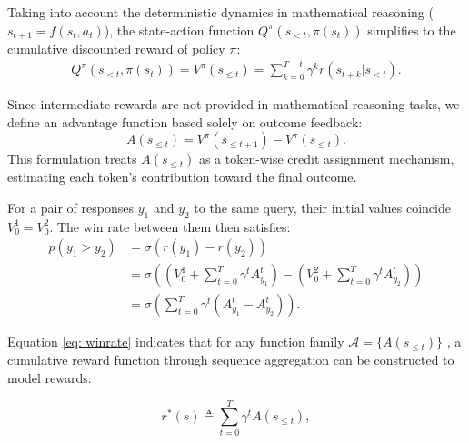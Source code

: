 Taking into account the deterministic dynamics in mathematical reasoning (\(s_{t+1} = f(s_t, a_t)\)), the state-action function $Q^\pi(s_{<t}, \pi(s_t))$ simplifies to the cumulative discounted reward of policy \(\pi\):  
\begin{align}\label{eq: vandq}
    Q^\pi(s_{<t}, \pi(s_t)) = V^\pi(s_{\leq t}) =  \sum_{k=0}^{T-t} \gamma^k r(s_{t+k} | s_{<t}).
\end{align}

Since intermediate rewards are not provided in mathematical reasoning tasks, we define an advantage function based solely on outcome feedback:
\begin{equation}
A(s_{\leq t}) = V^\pi(s_{\leq t+1}) - V^\pi(s_{\leq t}).
\end{equation}
This formulation treats \(A(s_{\leq t})\) as a token-wise credit assignment mechanism, estimating each token's contribution toward the final outcome.

For a pair of responses $y_1$ and $y_2$ to the same query, their initial values coincide $V_0^1 = V_0^2$. The win rate between them then satisfies:
\begin{equation}
\begin{aligned}\label{eq: winrate}
p(y_1>y_2)&=
\sigma(r(y_1) - r(y_2)) \\&= \sigma\left( \left(V_0^1 + \sum_{t=0}^T \gamma^t A_{y_1}^t\right) - \left(V_0^2 + \sum_{t=0}^T \gamma^t A_{y_2}^t\right) \right) \\
&= \sigma\left( \sum_{t=0}^T \gamma^t \left(A_{y_1}^t - A_{y_2}^t\right) \right).
\end{aligned}
\end{equation}

Equation \ref{eq: winrate} indicates that for any function family $\mathcal{A} = \{A(s_{\leq t})\}$ , a cumulative reward function through sequence aggregation can be constructed to model rewards:

\[
r^*(s) \triangleq \sum_{t=0}^{T} \gamma^t A(s_{\leq t}),
\]

